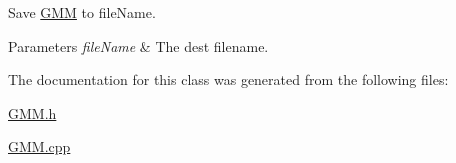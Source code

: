 Save \hyperlink{class_g_m_m}{G\+M\+M} to file\+Name. 


\begin{DoxyParams}{Parameters}
{\em file\+Name} & The dest filename. \\
\hline
\end{DoxyParams}


The documentation for this class was generated from the following files\+:\begin{DoxyCompactItemize}
\item 
\hyperlink{_g_m_m_8h}{G\+M\+M.\+h}\item 
\hyperlink{_g_m_m_8cpp}{G\+M\+M.\+cpp}\end{DoxyCompactItemize}

